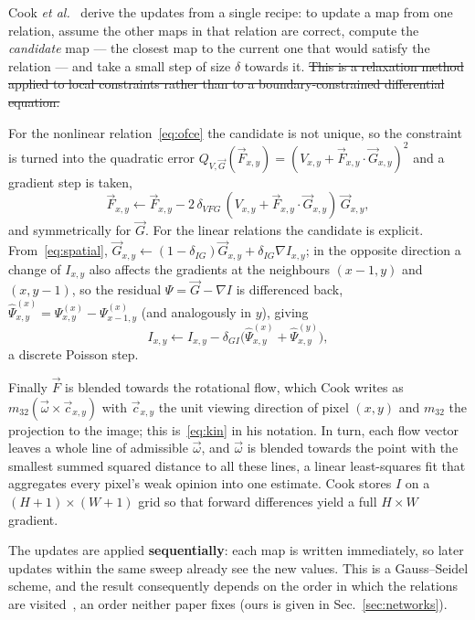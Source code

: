 \documentclass[journal]{IEEEtran}
\newcommand{\Imap}{I}
\newcommand{\Vmap}{V}
\newcommand{\Gmap}{\vec{G}}
\newcommand{\Fmap}{\vec{F}}
\newcommand{\wvec}{\vec{\omega}}
\begin{document}
Cook \emph{et al.}~\cite{cook2011,martel2015relational} derive the updates from a single recipe: to
update a map from one relation, assume the other maps in that relation are
correct, compute the \emph{candidate} map --- the closest map to the current one
that would satisfy the relation --- and take a small step of size $\delta$
towards it. \st{This is a relaxation method applied to local constraints rather than
to a boundary-constrained differential equation.}

For the nonlinear relation~\eqref{eq:ofce} the candidate is not unique, so the
constraint is turned into the quadratic error
$Q_{\Vmap,\Gmap}(\Fmap_{x,y}) = (\Vmap_{x,y}+\Fmap_{x,y}\cdot\Gmap_{x,y})^2$ and
a gradient step is taken,
\begin{equation}
\Fmap_{x,y} \leftarrow \Fmap_{x,y}
 - 2\,\delta_{V\!F\!G}\,
   (\Vmap_{x,y}+\Fmap_{x,y}\cdot\Gmap_{x,y})\,\Gmap_{x,y},
\label{eq:cook_ofce}
\end{equation}
and symmetrically for $\Gmap$. For the linear relations the candidate is
explicit. From~\eqref{eq:spatial},
$\Gmap_{x,y}\leftarrow(1-\delta_{I\!G})\Gmap_{x,y}+\delta_{I\!G}\nabla
\Imap_{x,y}$; in the opposite direction a change of $\Imap_{x,y}$ also affects
the gradients at the neighbours $(x\!-\!1,y)$ and $(x,y\!-\!1)$, so the residual
$\Psi=\Gmap-\nabla\Imap$ is differenced back,
$\hat\Psi^{(x)}_{x,y}=\Psi^{(x)}_{x,y}-\Psi^{(x)}_{x-1,y}$ (and analogously in
$y$), giving
\begin{equation}
\Imap_{x,y} \leftarrow \Imap_{x,y}
  - \delta_{G\!I}\big(\hat\Psi^{(x)}_{x,y}+\hat\Psi^{(y)}_{x,y}\big),
\label{eq:cook_poisson}
\end{equation}
a discrete Poisson step. 

Finally $\Fmap$ is blended towards the rotational flow, which Cook writes as $m_{32}(\wvec\times\vec c_{x,y})$ with $\vec c_{x,y}$ the unit viewing direction of pixel $(x,y)$ and $m_{32}$ the projection to the image; this is~\eqref{eq:kin} in his notation. In turn, each flow vector leaves a whole line of admissible $\wvec$, and $\wvec$ is blended towards the point with the smallest summed squared distance to all these lines, a linear least-squares fit that aggregates every pixel's weak opinion into one estimate. Cook stores
$\Imap$ on a $(H\!+\!1)\times(W\!+\!1)$ grid so that forward differences yield a
full $H\times W$ gradient.

The updates are applied \textbf{sequentially}: each map is written immediately,
so later updates within the same sweep already see the new values. This is a
Gauss--Seidel scheme, and the result consequently depends on the order in which the relations are visited~\cite{martel2015relational}, an order neither paper
fixes (ours is given in
Sec.~\ref{sec:networks}).
\end{document}

